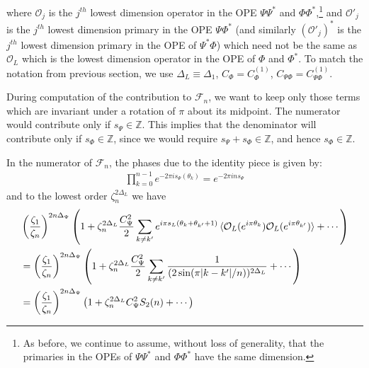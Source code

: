 \documentclass[11pt]{article}
\newcommand{\mO}{\mathcal{O}}
\newcommand{\nn}{\nonumber}
\newcommand{\lb}{\left(}
\newcommand{\rb}{\right)}
\begin{document}
  where $\mO_j$ is the $j^{th}$ lowest dimension operator in the OPE $\Psi\Psi^*$ and  $\Phi\Phi^*$,\footnote{As before, we continue to assume, without loss of generality, that the primaries in the OPEs of $\Psi \Psi^*$ and $\Phi \Phi^*$ have the same dimension.} and $\mO'_j$ is the $j^{th}$ lowest dimension primary in the OPE $\Psi\Phi^*$ (and similarly $(\mO'_j)^*$ is the $j^{th}$ lowest dimension primary in the OPE of $\Psi^*\Phi$) which need not be the same as $\mO_L$ which is the lowest dimension operator in the OPE of $\Phi$ and $\Phi^*$. To match the notation from previous section, we use $\Delta_L\equiv \Delta_1$, $C_\Phi=C_\Phi^{(1)}$, $C_{\Psi\Phi}=C^{(1)}_{\Psi\Phi}$. 

During computation of the contribution to $\mathcal{F}_n$, we want to keep only those terms which are invariant under a rotation of $\pi$ about its midpoint. The numerator would contribute only if $s_\Psi \in \mathbb{Z}$. This implies that the denominator will contribute only if $s_\Phi \in \mathbb{Z}$, since we would require $s_\Psi + s_\Phi \in \mathbb{Z}$, and hence $s_\Phi \in \mathbb{Z}$.


In the numerator of $\mathcal{F}_n$, the phases due to the identity piece is given by:
\begin{align}
  \prod_{k=0}^{n-1}e^{-2\pi i s_\Psi(\theta_k)}=e^{-2\pi i ns_\Psi}
\end{align}
and to the lowest order $\zeta_n^{2\Delta_L}$ we have 
\begin{align}
  &\lb \frac{\zeta_1}{\zeta_n}\rb^{2n\Delta_\Psi}\lb 1+\zeta_n^{2\Delta_L}\frac{C_\Psi^2}{2}\sum_{k\neq k'}e^{i\pi s_L(\theta_k+\theta_{k'}+1)}\braket{\mO_L(e^{i\pi\theta_k})\mO_L(e^{i\pi\theta_{k'}})}+\cdots \rb\nn\\
  &=\lb \frac{\zeta_1}{\zeta_n}\rb^{2n{\Delta_\Psi}}\lb 1+\zeta_n^{2\Delta_L}\frac{C^2_{\Psi}}{2}\sum_{k\neq k'}\frac{1}{(2\sin(\pi|k-k'|/n))^{2\Delta_L}}+\cdots \rb\nn\\
  &=\lb \frac{\zeta_1}{\zeta_n}\rb^{2n{\Delta_\Psi}}\lb 1+\zeta_n^{2\Delta_L}C^2_{{\Psi}} S_2(n)+\cdots \rb
\end{align}
\end{document}

